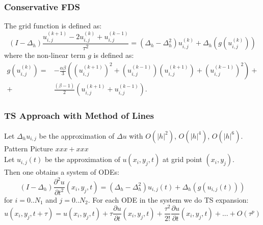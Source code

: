 \documentclass{beamer}
\newcommand{\be}{\begin{equation}}
\newcommand{\ee}{\end{equation}}
\newcommand{\RR}{\mathbb{R}}
\begin{document}

\begin{frame}
\frametitle{Conservative FDS}
The grid function is defined as:
\begin{equation}
(I-\Delta_h)\frac{ u^{(k+1)}_{i, j} - 2u^{(k)}_{i,j} + u^{(k-1)}_{i,j} }{\tau^2} = (\Delta_h - \Delta_h^2)u^{(k)}_{i,j} + \Delta_h(g(u^{(k)}_{i,j}))
\end{equation}
%
where the non-linear term $g$ is defined as:
\begin{align}
g(u^{(k)}_{i,j})=& -\frac{\alpha \beta} { 3 } \left( (u^{(k+1)}_{i,j})^2 + (u^{(k-1)}_{i,j})(u^{(k+1)}_{i,j}) + (u^{(k-1)}_{i,j})^2 \right) + \nonumber\\
+&\frac{ (\beta - 1 )}{ 2 }\left( u^{(k+1)}_{i,j} + u^{(k-1)}_{i,j} \right).
\end{align}


\end{frame}



\begin{frame}
\frametitle{TS Approach with Method of Lines}

Let $\Delta_h u_{i,j}$ be the approximation of $\Delta u$ with $O(|h|^2)$, $O(|h|^4)$, $O(|h|^6)$.
\\
Pattern Picture $x x x + x x x$
\\
Let $u_{i,j}(t)$ be the approximation of $u(x_i, y_j, t)$ at grid point $(x_i, y_j)$.
\\
Then one obtains a system of ODEs:
$$  (I-\Delta_h) \frac{\partial^2 u}{\partial t^2}(x_i, y_j, t)=
 (\Delta_h - \Delta_h^2) u_{i, j}(t) + \Delta_h ( g( u_{i, j}(t) ) )$$
for $i = 0..N_1$ and $j=0..N_2$. For each ODE in the system we do TS expansion:
\be
u(x_i, y_j, t+\tau) = u(x_i, y_j, t) + \tau \frac{ \partial u }{ \partial t }(x_i, y_j, t) + \frac{ \tau^2 }{ 2! } \frac{ \partial u }{ \partial t }(x_i, y_j, t) + ... + O(\tau^p)
\ee


\end{frame}
\end{document}
